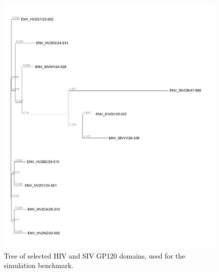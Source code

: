 \documentclass{bioinfo}
\begin{document}
\begin{figure}
  \includegraphics[width=\columnwidth]{gp120tree.pdf}
  \caption{
    Tree of selected HIV and SIV GP120 domains, used for the simulation benchmark.
  }
\end{figure}
\end{document}
